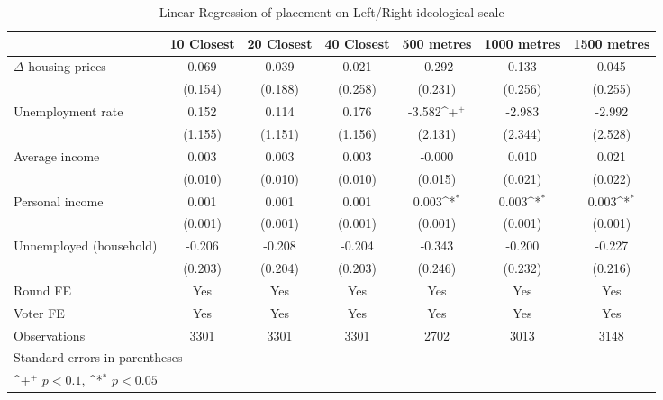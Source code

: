 \begin{table}[htbp]\centering
\def\sym#1{\ifmmode^{#1}\else\(^{#1}\)\fi}
\caption{Linear Regression of placement on Left/Right ideological scale } \label{indaltdv}
\begin{tabular}{l*{6}{c}}
\hline\hline
                    &\multicolumn{1}{c}{10 Closest}&\multicolumn{1}{c}{20 Closest}&\multicolumn{1}{c}{40 Closest}&\multicolumn{1}{c}{500 metres}&\multicolumn{1}{c}{1000 metres}&\multicolumn{1}{c}{1500 metres}\\
\hline
$\Delta$ housing prices&       0.069       &       0.039&       0.021       &      -0.292       &       0.133       &       0.045       \\
                    &     (0.154)       &     (0.188)       &     (0.258)       &     (0.231)       &     (0.256)       &     (0.255)       \\
[1em]
Unemployment rate   &       0.152       &       0.114       &       0.176       &      -3.582\sym{+}&      -2.983       &      -2.992       \\
                    &     (1.155)       &     (1.151)       &     (1.156)       &     (2.131)       &     (2.344)       &     (2.528)       \\
[1em]
Average income      &       0.003       &       0.003       &       0.003       &      -0.000       &       0.010       &       0.021       \\
                    &     (0.010)       &     (0.010)       &     (0.010)       &     (0.015)       &     (0.021)       &     (0.022)       \\
[1em]
Personal income     &       0.001       &       0.001       &       0.001       &       0.003\sym{*}&       0.003\sym{*}&       0.003\sym{*}\\
                    &     (0.001)       &     (0.001)       &     (0.001)       &     (0.001)       &     (0.001)       &     (0.001)       \\
[1em]
Unnemployed (household)&      -0.206       &      -0.208       &      -0.204       &      -0.343       &      -0.200       &      -0.227       \\
                    &     (0.203)       &     (0.204)       &     (0.203)       &     (0.246)       &     (0.232)       &     (0.216)       \\
[1em]
\hline  Round FE    &         Yes       &         Yes       &         Yes       &         Yes       &         Yes       &         Yes       \\
[1em]
Voter FE            &         Yes       &         Yes       &         Yes       &         Yes       &         Yes       &         Yes       \\
\hline
Observations        &        3301       &        3301       &        3301       &        2702       &        3013       &        3148       \\
\hline\hline
\multicolumn{7}{l}{\footnotesize Standard errors in parentheses}\\
\multicolumn{7}{l}{\footnotesize \sym{+} \(p<0.1\), \sym{*} \(p<0.05\)}\\
\end{tabular}
\end{table}
